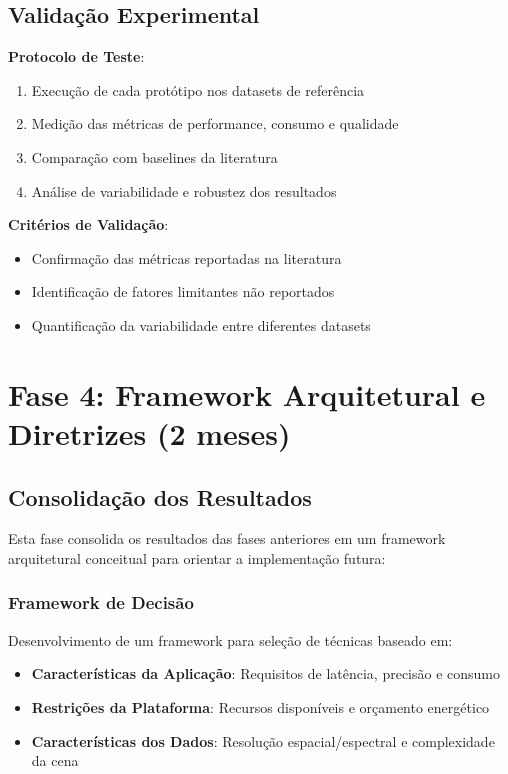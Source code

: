 \subsection{Validação Experimental}

\textbf{Protocolo de Teste}:
\begin{enumerate}
\item Execução de cada protótipo nos datasets de referência
\item Medição das métricas de performance, consumo e qualidade
\item Comparação com baselines da literatura
\item Análise de variabilidade e robustez dos resultados
\end{enumerate}

\textbf{Critérios de Validação}:
\begin{itemize}
\item Confirmação das métricas reportadas na literatura
\item Identificação de fatores limitantes não reportados
\item Quantificação da variabilidade entre diferentes datasets
\end{itemize}

\section{Fase 4: Framework Arquitetural e Diretrizes (2 meses)}

\subsection{Consolidação dos Resultados}

Esta fase consolida os resultados das fases anteriores em um framework arquitetural conceitual para orientar a implementação futura:

\subsubsection{Framework de Decisão}

Desenvolvimento de um framework para seleção de técnicas baseado em:
\begin{itemize}
\item \textbf{Características da Aplicação}: Requisitos de latência, precisão e consumo
\item \textbf{Restrições da Plataforma}: Recursos disponíveis e orçamento energético
\item \textbf{Características dos Dados}: Resolução espacial/espectral e complexidade da cena
\end{itemize}

